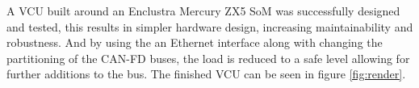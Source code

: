 \documentclass{article}
\begin{document}
\begin{multicols}{3}
A VCU built around an Enclustra Mercury ZX5 SoM was successfully designed and tested, this results in simpler hardware design, increasing maintainability and robustness. And by using the an Ethernet interface along with changing the partitioning of the CAN-FD buses, the load is reduced to a safe level allowing for further additions to the bus. The finished VCU can be seen in figure \ref{fig:render}. \cite{this}



\printbibliography

\end{multicols}
\end{document}
